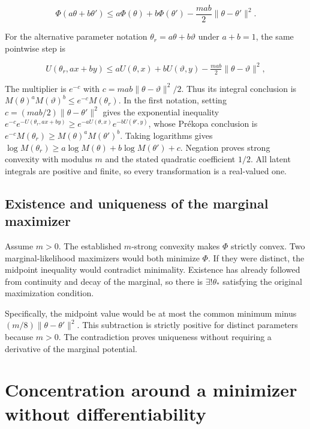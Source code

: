 \documentclass[11pt,a4paper]{article}
\begin{document}
\[\Phi(a\theta+b\theta')\le a\Phi(\theta)+b\Phi(\theta')-\frac{mab}{2}\|\theta-\theta'\|^2.\]

For the alternative parameter notation \(\theta_r=a\theta+b\vartheta\) under \(a+b=1\), the same pointwise step is

\[U(\theta_r,ax+by)\le aU(\theta,x)+bU(\vartheta,y)-\tfrac{mab}{2}\|\theta-\vartheta\|^2,\]

The multiplier is \(e^{-c}\) with \(c=mab\|\theta-\vartheta\|^2/2\). Thus its integral conclusion is \(M(\theta)^aM(\vartheta)^b\le e^{-c}M(\theta_r)\). In the first notation, setting \(c=(mab/2)\|\theta-\theta'\|^2\) gives the exponential inequality \(e^{-c}e^{-U(\theta_r,ax+by)}\ge e^{-aU(\theta,x)}e^{-bU(\theta',y)}\), whose Prékopa conclusion is \(e^{-c}M(\theta_r)\ge M(\theta)^aM(\theta')^b\). Taking logarithms gives \(\log M(\theta_r)\ge a\log M(\theta)+b\log M(\theta')+c\). Negation proves strong convexity with modulus \(m\) and the stated quadratic coefficient \(1/2\). All latent integrals are positive and finite, so every transformation is a real-valued one.




\subsection{\texorpdfstring{Existence and uniqueness of the marginal maximizer}{Existence and uniqueness of the marginal maximizer}}


Assume \(m>0\). The established \(m\)-strong convexity makes \(\Phi\) strictly convex. Two marginal-likelihood maximizers would both minimize \(\Phi\). If they were distinct, the midpoint inequality would contradict minimality. Existence has already followed from continuity and decay of the marginal, so there is \(\exists!\theta_*\) satisfying the original maximization condition.



Specifically, the midpoint value would be at most the common minimum minus \((m/8)\|\theta-\theta'\|^2\). This subtraction is strictly positive for distinct parameters because \(m>0\). The contradiction proves uniqueness without requiring a derivative of the marginal potential.



\section{\texorpdfstring{Concentration around a minimizer without differentiability}{Concentration around a minimizer without differentiability}}
\end{document}
